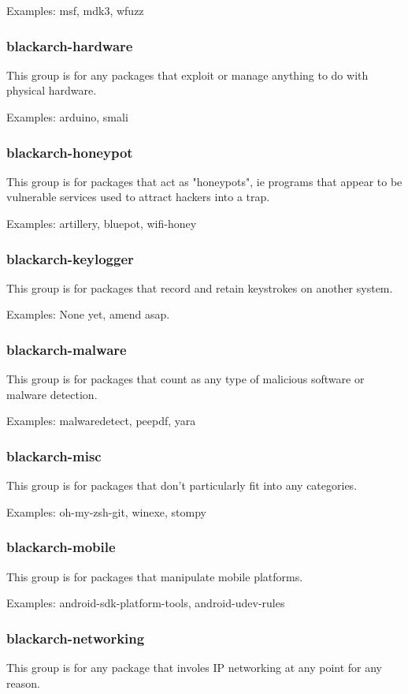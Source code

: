 \documentclass[a4paper, oneside, 11pt]{book}
\begin{document}
Examples: msf, mdk3, wfuzz

\subsubsection{blackarch-hardware}
This group is for any packages that exploit or manage anything to do with
physical hardware.

Examples: arduino, smali

\subsubsection{blackarch-honeypot}
This group is for packages that act as "honeypots", ie programs that appear to
be vulnerable services used to attract hackers into a trap.

Examples: artillery, bluepot, wifi-honey

\subsubsection{blackarch-keylogger}
This group is for packages that record and retain keystrokes on another system.

Examples: None yet, amend asap.

\subsubsection{blackarch-malware}
This group is for packages that count as any type of malicious software or
malware detection.

Examples: malwaredetect, peepdf, yara

\subsubsection{blackarch-misc}
This group is for packages that don't particularly fit into any categories.

Examples: oh-my-zsh-git, winexe, stompy

\subsubsection{blackarch-mobile}
This group is for packages that manipulate mobile platforms.

Examples: android-sdk-platform-tools, android-udev-rules

\subsubsection{blackarch-networking}
This group is for any package that involes IP networking at any point for any
reason.
\end{document}
